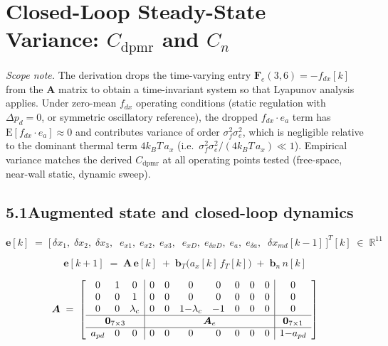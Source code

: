 \documentclass[11pt]{article}
\newcommand{\T}{^{T}}
\newcommand{\lc}{\lambda_c}
\newcommand{\kB}{k_B}
\begin{document}
\section{Closed-Loop Steady-State Variance: $C_{\mathrm{dpmr}}$ and $C_{n}$}

\emph{Scope note.} The derivation drops the time-varying entry $\bm{F}_e(3,6) = -f_{dx}[k]$ from the $\bm{A}$ matrix to obtain a time-invariant system so that Lyapunov analysis applies. Under zero-mean $f_{dx}$ operating conditions (static regulation with $\Delta p_d = 0$, or symmetric oscillatory reference), the dropped $f_{dx}\!\cdot\!e_a$ term has $\mathrm{E}[f_{dx}\!\cdot\!e_a] \approx 0$ and contributes variance of order $\sigma^{2}_{f}\sigma^{2}_{e}$, which is negligible relative to the dominant thermal term $4\kB T\,a_x$ (i.e.\ $\sigma^{2}_{f}\sigma^{2}_{e} / (4\kB T\,a_x) \ll 1$). Empirical variance matches the derived $C_{\mathrm{dpmr}}$ at all operating points tested (free-space, near-wall static, dynamic sweep).

\subsection*{5.1\quad Augmented state and closed-loop dynamics}

\[
\bm{e}[k] \;=\; \bigl[\,
  \delta x_1,\; \delta x_2,\; \delta x_3,\;\;
  e_{x1},\; e_{x2},\; e_{x3},\;\;
  e_{xD},\; e_{\delta xD},\; e_{a},\; e_{\delta a},\;\;
  \delta x_{md}[k\!-\!1]
\,\bigr]\T[k]
\;\in\; \mathbb{R}^{11}
\]

\begin{equation}
\bm{e}[k\!+\!1] \;=\; \bm{A}\,\bm{e}[k]
  \;+\; \bm{b}_T\bigl(a_x[k]\,f_T[k]\bigr)
  \;+\; \bm{b}_n\,n[k]
\end{equation}

\[
\bm{A} \;=\;
\left[\begin{array}{ccc|ccccccc|c}
0 & 1 & 0   & 0 & 0 & 0 & 0 & 0 & 0 & 0 & 0 \\
0 & 0 & 1   & 0 & 0 & 0 & 0 & 0 & 0 & 0 & 0 \\
0 & 0 & \lc & 0 & 0 & 1{-}\lc & {-}1 & 0 & 0 & 0 & 0 \\
\hline
\multicolumn{3}{c|}{\bm{0}_{7\times 3}} & \multicolumn{7}{c|}{\bm{A}_e} & \multicolumn{1}{c}{\bm{0}_{7\times 1}} \\
\hline
a_{pd} & 0 & 0 & 0 & 0 & 0 & 0 & 0 & 0 & 0 & 1{-}a_{pd}
\end{array}\right]
\]
\end{document}
